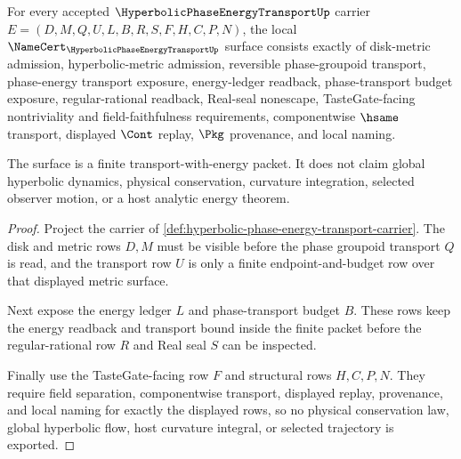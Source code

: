 \begin{theorem}
\label{thm:hyperbolic-phase-energy-transport-namecert-obligations}
For every accepted $\HyperbolicPhaseEnergyTransportUp$ carrier $E=(D,M,Q,U,L,B,R,S,F,H,C,P,N)$, the local $\NameCert_{\HyperbolicPhaseEnergyTransportUp}$ surface consists exactly of disk-metric admission, hyperbolic-metric admission, reversible phase-groupoid transport, phase-energy transport exposure, energy-ledger readback, phase-transport budget exposure, regular-rational readback, Real-seal nonescape, TasteGate-facing nontriviality and field-faithfulness requirements, componentwise $\hsame$ transport, displayed $\Cont$ replay, $\Pkg$ provenance, and local naming.

The surface is a finite transport-with-energy packet. It does not claim global hyperbolic dynamics, physical conservation, curvature integration, selected observer motion, or a host analytic energy theorem.
\end{theorem}
\begin{proof}
Project the carrier of \autoref{def:hyperbolic-phase-energy-transport-carrier}. The disk and metric rows $D,M$ must be visible before the phase groupoid transport $Q$ is read, and the transport row $U$ is only a finite endpoint-and-budget row over that displayed metric surface.

Next expose the energy ledger $L$ and phase-transport budget $B$. These rows keep the energy readback and transport bound inside the finite packet before the regular-rational row $R$ and Real seal $S$ can be inspected.

Finally use the TasteGate-facing row $F$ and structural rows $H,C,P,N$. They require field separation, componentwise transport, displayed replay, provenance, and local naming for exactly the displayed rows, so no physical conservation law, global hyperbolic flow, host curvature integral, or selected trajectory is exported.
\end{proof}

